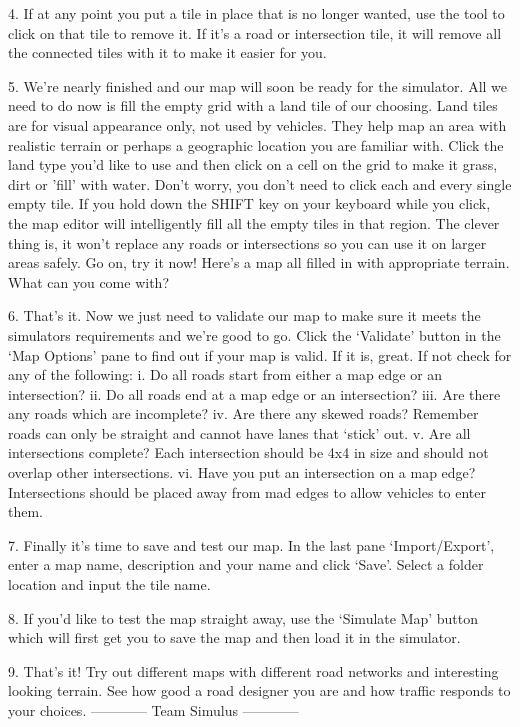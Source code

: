 \documentclass[12pt,a4paper]{article}
\begin{document}
4.	If at any point you put a tile in place that is no longer wanted, use the   tool to click on that tile to remove it.  If it’s a road or intersection tile, it will remove all the connected tiles with it to make it easier for you.

5.	 We’re nearly finished and our map will soon be ready for the simulator.  All we need to do now is fill the empty grid with a land tile of our choosing.  Land tiles are for visual appearance only, not used by vehicles.  They help map an area with realistic terrain or perhaps a geographic location you are familiar with.
Click the land type you’d like to use and then click on a cell on the grid to make it grass, dirt or 'fill' with water.  Don’t worry, you don’t need to click each and every single empty tile.  If you hold down the SHIFT key on your keyboard while you click, the map editor will intelligently fill all the empty tiles in that region.  The clever thing is, it won’t replace any roads or intersections so you can use it on larger areas safely.  Go on, try it now!  
Here’s a map all filled in with appropriate terrain.  What can you come with?
 
6.	That’s it.  Now we just need to validate our map to make sure it meets the simulators requirements and we’re good to go.  Click the ‘Validate’ button in the ‘Map Options’ pane to find out if your map is valid.  If it is, great.  If not check for any of the following:
i.	Do all roads start from either a map edge or an intersection?
ii.	Do all roads end at a map edge or an intersection?
iii.	Are there any roads which are incomplete?
iv.	Are there any skewed roads?  Remember roads can only be straight and cannot have lanes that ‘stick’ out.
v.	Are all intersections complete? Each intersection should be 4x4 in size and should not overlap other intersections.
vi.	Have you put an intersection on a map edge?  Intersections should be placed away from mad edges to allow vehicles to enter them.

7.	Finally it’s time to save and test our map.  In the last pane ‘Import/Export’, enter a map name, description and your name and click ‘Save’.  Select a folder location and input the tile name.

8.	If you’d like to test the map straight away, use the ‘Simulate Map’ button which will first get you to save the map and then load it in the simulator.

9.	That’s it!  Try out different maps with different road networks and interesting looking terrain.  See how good a road designer you are and how traffic responds to your choices.
------------
Team Simulus
------------
\end{document}
